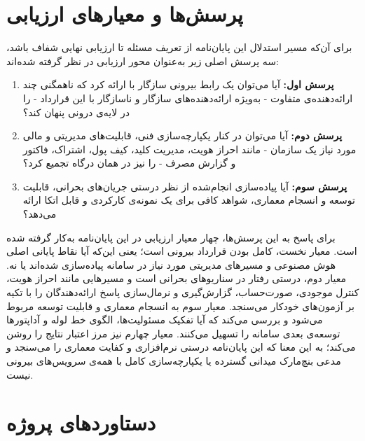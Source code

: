 \section{پرسش‌ها و معیارهای ارزیابی}
\label{sec:research-questions}

برای آن‌که مسیر استدلال این پایان‌نامه از تعریف مسئله تا ارزیابی نهایی
شفاف باشد، سه پرسش اصلی زیر به‌عنوان محور ارزیابی در نظر گرفته شده‌اند:

\begin{enumerate}

  \item \textbf{پرسش اول:} آیا می‌توان یک رابط بیرونی سازگار با 
    ارائه کرد که ناهمگنی چند ارائه‌دهنده‌ی متفاوت - به‌ویژه ارائه‌دهنده‌های
    سازگار و ناسازگار با این قرارداد - را در لایه‌ی درونی پنهان کند؟

  \item \textbf{پرسش دوم:} آیا می‌توان در کنار یکپارچه‌سازی فنی، قابلیت‌های
    مدیریتی و مالی مورد نیاز یک سازمان - مانند احراز هویت، مدیریت کلید،
    کیف پول، اشتراک، فاکتور و گزارش مصرف - را نیز در همان درگاه تجمیع کرد؟

  \item \textbf{پرسش سوم:} آیا پیاده‌سازی انجام‌شده از نظر درستی جریان‌های
    بحرانی، قابلیت توسعه و انسجام معماری، شواهد کافی برای یک نمونه‌ی
    کارکردی و قابل اتکا ارائه می‌دهد؟

\end{enumerate}

برای پاسخ به این پرسش‌ها، چهار معیار ارزیابی در این پایان‌نامه به‌کار
گرفته شده است. معیار نخست، کامل بودن قرارداد بیرونی است؛ یعنی این‌که آیا
نقاط پایانی اصلی هوش مصنوعی و مسیرهای مدیریتی مورد نیاز در سامانه
پیاده‌سازی شده‌اند یا نه. معیار دوم، درستی رفتار در سناریوهای بحرانی
است و مسیرهایی مانند احراز هویت، کنترل موجودی، صورت‌حساب، گزارش‌گیری و
نرمال‌سازی پاسخ ارائه‌دهندگان را با تکیه بر آزمون‌های خودکار می‌سنجد.
معیار سوم به انسجام معماری و قابلیت توسعه مربوط می‌شود و بررسی می‌کند که
آیا تفکیک مسئولیت‌ها، الگوی خط لوله و آداپتورها توسعه‌ی بعدی سامانه را
تسهیل می‌کنند. معیار چهارم نیز مرز اعتبار نتایج را روشن می‌کند؛ به این
معنا که این پایان‌نامه درستی نرم‌افزاری و کفایت معماری را می‌سنجد و
مدعی بنچ‌مارک میدانی گسترده یا یکپارچه‌سازی کامل با همه‌ی سرویس‌های
بیرونی نیست.

\section{دستاوردهای پروژه}
\label{sec:contributions}

